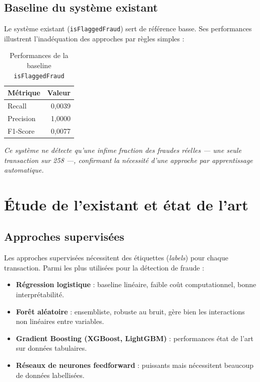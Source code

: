 \subsection{Baseline du système existant}

Le système existant (\texttt{isFlaggedFraud}) sert de référence basse. Ses performances
illustrent l'inadéquation des approches par règles simples :

\begin{table}[H]
\centering
\caption{Performances de la baseline \texttt{isFlaggedFraud}}
\label{tab:baseline_perf}
\begin{tabular}{lr}
\toprule
\textbf{Métrique} & \textbf{Valeur} \\
\midrule
Recall    & 0,0039 \\
Precision & 1,0000 \\
F1-Score  & 0,0077 \\
\bottomrule
\end{tabular}
\end{table}

\textit{Ce système ne détecte qu'une infime fraction des fraudes réelles --- une seule
transaction sur 258 ---, confirmant la nécessité d'une approche par apprentissage
automatique.}

\section{Étude de l'existant et état de l'art}

\subsection{Approches supervisées}

Les approches supervisées nécessitent des étiquettes (\textit{labels}) pour chaque
transaction. Parmi les plus utilisées pour la détection de fraude :

\begin{itemize}
  \item \textbf{Régression logistique} : baseline linéaire, faible coût computationnel,
    bonne interprétabilité.
  \item \textbf{Forêt aléatoire} : ensembliste, robuste au bruit, gère bien les
    interactions non linéaires entre variables.
  \item \textbf{Gradient Boosting (XGBoost, LightGBM)} : performances état de l'art
    sur données tabulaires.
  \item \textbf{Réseaux de neurones feedforward} : puissants mais nécessitent beaucoup
    de données labellisées.
\end{itemize}

